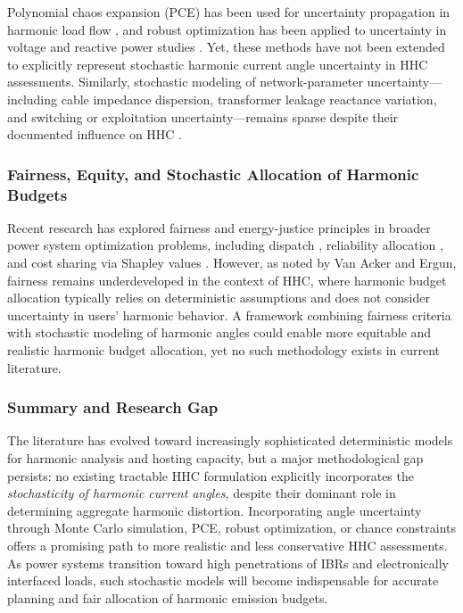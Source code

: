 Polynomial chaos expansion (PCE) has been used for uncertainty propagation in harmonic load flow \cite{pce_harmonics}, and robust optimization has been applied to uncertainty in voltage and reactive power studies \cite{bertsimas2004robust}. Yet, these methods have not been extended to explicitly represent stochastic harmonic current angle uncertainty in HHC assessments. Similarly, stochastic modeling of network-parameter uncertainty---including cable impedance dispersion, transformer leakage reactance variation, and switching or exploitation uncertainty---remains sparse despite their documented influence on HHC \cite{vanacker2025impact, geth2022harmonic}.

\subsubsection{Fairness, Equity, and Stochastic Allocation of Harmonic Budgets}
Recent research has explored fairness and energy-justice principles in broader power system optimization problems, including dispatch \cite{sun2020gini}, reliability allocation \cite{heylen2019fairness}, and cost sharing via Shapley values \cite{obrien2016shapley}. However, as noted by Van Acker and Ergun, fairness remains underdeveloped in the context of HHC, where harmonic budget allocation typically relies on deterministic assumptions and does not consider uncertainty in users' harmonic behavior. A framework combining fairness criteria with stochastic modeling of harmonic angles could enable more equitable and realistic harmonic budget allocation, yet no such methodology exists in current literature.

\subsubsection{Summary and Research Gap}
The literature has evolved toward increasingly sophisticated deterministic models for harmonic analysis and hosting capacity, but a major methodological gap persists: no existing tractable HHC formulation explicitly incorporates the \emph{stochasticity of harmonic current angles}, despite their dominant role in determining aggregate harmonic distortion. Incorporating angle uncertainty through Monte Carlo simulation, PCE, robust optimization, or chance constraints offers a promising path to more realistic and less conservative HHC assessments. As power systems transition toward high penetrations of IBRs and electronically interfaced loads, such stochastic models will become indispensable for accurate planning and fair allocation of harmonic emission budgets.



